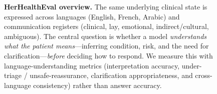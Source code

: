 \begin{figure}[t]
\caption{\textbf{HerHealthEval overview.} The same underlying clinical state is
expressed across languages (English, French, Arabic) and communication registers
(clinical, lay, emotional, indirect/cultural, ambiguous). The central question is
whether a model \emph{understands what the patient means}---inferring condition,
risk, and the need for clarification---\emph{before} deciding how to respond. We
measure this with language-understanding metrics (interpretation accuracy,
under-triage / unsafe-reassurance, clarification appropriateness, and
cross-language consistency) rather than answer accuracy.}
\label{fig:overview}
\end{figure}
